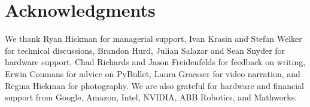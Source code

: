 \documentclass[journal]{IEEEtran}
\newcommand{\mypara}[1]{\par\vspace*{0.8mm}\noindent\textbf{\textit{#1}}}
\begin{document}


\section*{Acknowledgments}

We thank Ryan Hickman for managerial support, Ivan Krasin and Stefan Welker for technical discussions, Brandon Hurd, Julian Salazar and Sean Snyder for hardware support, Chad Richards and Jason Freidenfelds for feedback on writing, Erwin Coumans for advice on PyBullet, Laura Graesser for video narration, and Regina Hickman for photography. We are also grateful for hardware and financial support from Google, Amazon, Intel, NVIDIA, ABB Robotics, and Mathworks.



\footnotesize

\end{document}
